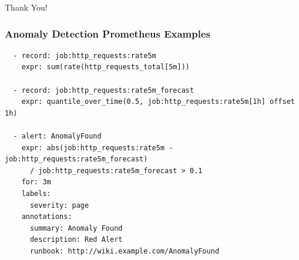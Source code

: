 \begin{frame}[standout]
    Thank You!
\end{frame}

\appendix

\begin{frame}[fragile]
    \frametitle{Anomaly Detection Prometheus Examples}

\begin{lstlisting}
  - record: job:http_requests:rate5m
    expr: sum(rate(http_requests_total[5m]))

  - record: job:http_requests:rate5m_forecast
    expr: quantile_over_time(0.5, job:http_requests:rate5m[1h] offset 1h)

  - alert: AnomalyFound
    expr: abs(job:http_requests:rate5m - job:http_requests:rate5m_forecast)
      / job:http_requests:rate5m_forecast > 0.1
    for: 3m
    labels:
      severity: page
    annotations:
      summary: Anomaly Found
      description: Red Alert
      runbook: http://wiki.example.com/AnomalyFound
\end{lstlisting}
\end{frame}


